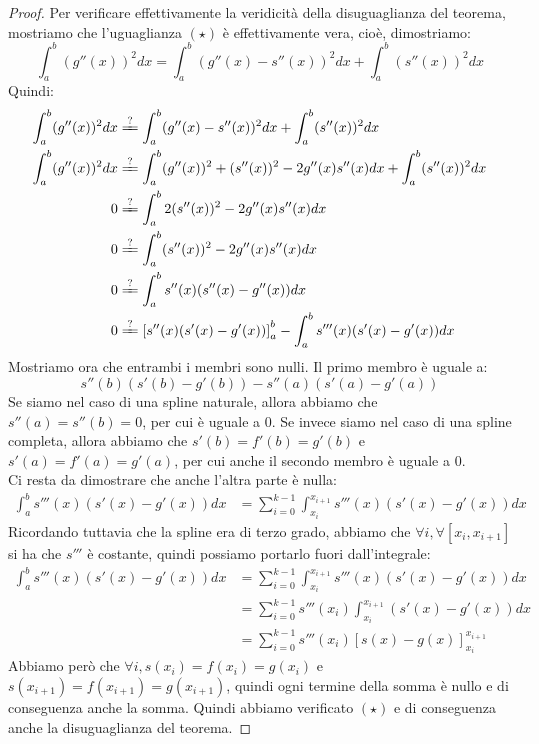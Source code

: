 \documentclass[11pt,a4paper,twoside]{article}
\theoremstyle{definition}
\begin{document}
\begin{proof}
	Per verificare effettivamente la veridicità della disuguaglianza del teorema, mostriamo che l'uguaglianza $(\star)$ è effettivamente vera, cioè, dimostriamo:
	\[ \int_a^b (g''(x))^2 dx = \int_a^b (g''(x)-s''(x))^2dx + \int_a^b(s''(x))^2dx \]
	Quindi:
	\begin{align*}
		\int_a^b (g''(x))^2 dx & \xlongequal ? \int_a^b (g''(x)-s''(x))^2dx + \int_a^b(s''(x))^2dx\\
		\int_a^b (g''(x))^2 dx & \xlongequal ? \int_a^b (g''(x))^2+(s''(x))^2 - 2g''(x)s''(x)dx + \int_a^b(s''(x))^2dx\\
		0 & \xlongequal ? \int_a^b 2(s''(x))^2 - 2g''(x)s''(x)dx\\
		0 & \xlongequal ? \int_a^b (s''(x))^2 - 2g''(x)s''(x)dx\\
		0 & \xlongequal ? \int_a^b s''(x)(s''(x)-g''(x))dx\\
		0 & \xlongequal ? \left[ s''(x)(s'(x) - g'(x)) \right]_a^b - \int_a^b s'''(x)(s'(x) - g'(x))dx
	\end{align*}
	Mostriamo ora che entrambi i membri sono nulli.
	Il primo membro è uguale a:
	\[ s''(b)(s'(b)-g'(b)) - s''(a)(s'(a) - g'(a)) \]
	Se siamo nel caso di una spline naturale, allora abbiamo che $s''(a) = s''(b) = 0$, per cui è uguale a $0$. Se invece siamo nel caso di una spline completa, allora abbiamo che $s'(b) = f'(b) = g'(b)$ e $s'(a) = f'(a) = g'(a)$, per cui anche il secondo membro è uguale a $0$.\\
	Ci resta da dimostrare che anche l'altra parte è nulla:
	\begin{align*}
		\int_a^b s'''(x)(s'(x) - g'(x))dx &= \sum_{i = 0}^{k-1} \int_{x_i}^{x_{i+1}} s'''(x)(s'(x) - g'(x))dx
	\end{align*}
	Ricordando tuttavia che la spline era di terzo grado, abbiamo che $\forall i, \forall [x_i, x_{i+1}]$ si ha che $s'''$ è costante, quindi possiamo portarlo fuori dall'integrale:
	\begin{align*}
		\int_a^b s'''(x)(s'(x) - g'(x))dx &= \sum_{i = 0}^{k-1} \int_{x_i}^{x_{i+1}} s'''(x)(s'(x) - g'(x))dx\\
		&= \sum_{i = 0}^{k-1} s'''(x_i) \int_{x_i}^{x_{i+1}} (s'(x) - g'(x))dx\\
		&= \sum_{i = 0}^{k-1} s'''(x_i) [s(x) - g(x)]_{x_i}^{x_{i+1}}
	\end{align*}
	Abbiamo però che $\forall i, s(x_i) = f(x_i) = g(x_i)$ e $s(x_{i+1}) = f(x_{i+1}) = g(x_{i+1})$, quindi ogni termine della somma è nullo e di conseguenza anche la somma. Quindi abbiamo verificato $(\star)$ e di conseguenza anche la disuguaglianza del teorema.
\end{proof}
\end{document}
